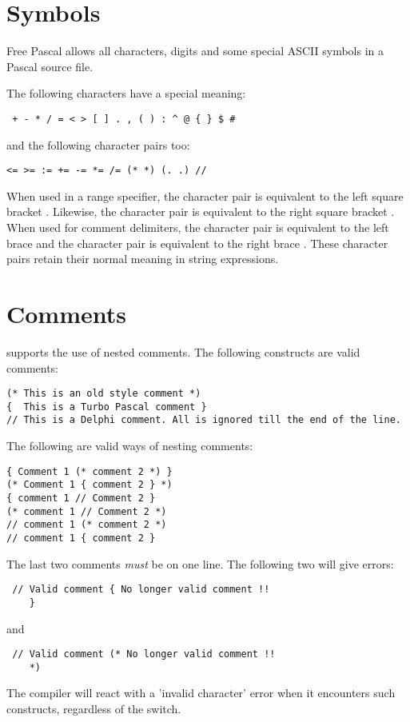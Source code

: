 \documentclass{report}
\begin{document}
\section{Symbols}
Free Pascal allows all characters, digits and some special ASCII symbols
in a Pascal source file.

The following characters have a special meaning:
\begin{verbatim}
 + - * / = < > [ ] . , ( ) : ^ @ { } $ #
\end{verbatim}
and the following character pairs too:
\begin{verbatim}
<= >= := += -= *= /= (* *) (. .) //
\end{verbatim}
When used in a range specifier, the character pair  is equivalent to
the left square bracket \var{[}. Likewise, the character pair  is
equivalent to the right square bracket \var{]}.
When used for comment delimiters, the character pair \var{(*} is equivalent
to the  left brace \var{\{} and the character pair \var{*)} is equivalent
to the right brace \var{\}}.
These character pairs retain their normal meaning in string expressions.


\section{Comments}
\fpc supports the use of nested comments. The following constructs are valid
comments:
\begin{verbatim}
(* This is an old style comment *)
{  This is a Turbo Pascal comment }
// This is a Delphi comment. All is ignored till the end of the line.
\end{verbatim}
The following are valid ways of nesting comments:
\begin{verbatim}
{ Comment 1 (* comment 2 *) }
(* Comment 1 { comment 2 } *)
{ comment 1 // Comment 2 }
(* comment 1 // Comment 2 *)
// comment 1 (* comment 2 *)
// comment 1 { comment 2 }
\end{verbatim}
The last two comments {\em must} be on one line. The following two will give
errors:
\begin{verbatim}
 // Valid comment { No longer valid comment !!
    }
\end{verbatim}
and
\begin{verbatim}
 // Valid comment (* No longer valid comment !!
    *)
\end{verbatim}
The compiler will react with a 'invalid character' error when it encounters
such constructs, regardless of the  switch.
\end{document}

